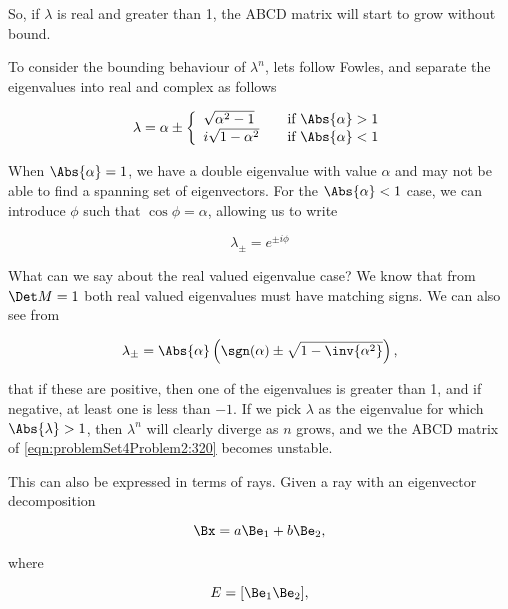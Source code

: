 {So, if $\lambda$ is real and greater than 1, the ABCD matrix will start to grow without bound.

To consider the bounding behaviour of $\lambda^n$, lets follow Fowles, and separate the eigenvalues into real and complex as follows

\begin{dmath}\label{eqn:problemSet4Problem2:180}
\lambda = \alpha \pm 
\left\{
\begin{array}{l l}
\sqrt{\alpha^2 - 1} & \quad \mbox{if $\Abs{\alpha} > 1$} \\
i \sqrt{1 - \alpha^2} & \quad \mbox{if $\Abs{\alpha} < 1$} 
\end{array}
\right.
\end{dmath}

When $\Abs{\alpha} = 1$, we have a double eigenvalue with value $\alpha$ and may not be able to find a spanning set of eigenvectors.  For the $\Abs{\alpha} < 1$ case, we can introduce $\phi$ such that $\cos\phi = \alpha$, allowing us to write

\begin{dmath}\label{eqn:problemSet4Problem2:1100}
\lambda_{\pm} = e^{\pm i \phi}
\end{dmath}

What can we say about the real valued eigenvalue case?  We know that from $\Det M = 1$ both real valued eigenvalues must have matching signs.  We can also see from

\begin{dmath}\label{eqn:problemSet4Problem2:240}
\lambda_{\pm} = \Abs{\alpha} \left( \sgn(\alpha) \pm \sqrt{1 - \inv{\alpha^2}} \right),
\end{dmath}

that if these are positive, then one of the eigenvalues is greater than 1, and if negative, at least one is less than $-1$.  If we pick $\lambda$ as the eigenvalue for which $\Abs{\lambda} > 1$, then $\lambda^n$ will clearly diverge as $n$ grows, and we the ABCD matrix of \ref{eqn:problemSet4Problem2:320} becomes unstable.

This can also be expressed in terms of rays.  Given a ray with an eigenvector decomposition

\begin{dmath}\label{eqn:problemSet4Problem2:340}
\Bx = a \Be_1 + b \Be_2,
\end{dmath}

where

\begin{dmath}\label{eqn:problemSet4Problem2:360}
E = [ \Be_1 \Be_2 ],
\end{dmath}

}
